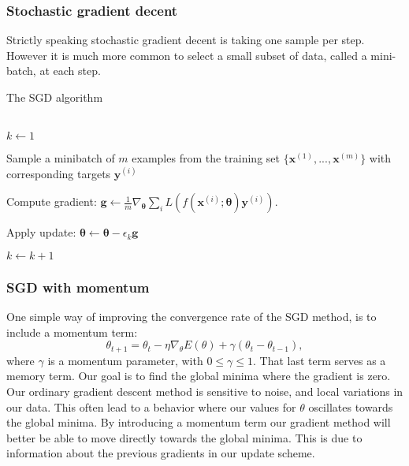 \subsubsection{Stochastic gradient decent}
Strictly speaking stochastic gradient decent is taking one sample per step. 
However it is much more common to select a small subset of data, called a
mini-batch, at each step.

\begin{algorithm}
\caption{The SGD algorithm}\label{alg:SGD}
\begin{algorithmic}
    \\
    $k\gets1$

     Sample a minibatch of $m$ examples from the training set
        $\{\boldsymbol{x}^{(1)}, ..., \boldsymbol{x}^{(m)}\}$ with corresponding
        targets $\boldsymbol{y}^{(i)}$
        
        Compute gradient: $\boldsymbol{g} \gets
        \frac{1}{m}\nabla_{\boldsymbol\theta}
        \sum_{i}L(f(\boldsymbol{x}^{(i)};\boldsymbol{\theta})\boldsymbol{y}^{(i)})$.
        
        Apply update: $\boldsymbol{\theta} \gets
        \boldsymbol{\theta}-\epsilon_k\boldsymbol{g}$

        $k\gets k+1$
    \EndWhile
\end{algorithmic}
\end{algorithm}


\subsubsection{SGD with momentum}


One simple way of improving the convergence rate of the SGD method, is to
include a momentum term: 
\begin{equation*}
    \theta _{t+1} = \theta _t - \eta \nabla_\theta E(\theta )+\gamma (\theta_t
    -\theta_{t-1}     ) ,
\end{equation*}
where $\gamma $ is a momentum parameter, with $0\leq \gamma \leq1$. That last
term serves as a memory term. Our goal is to find the
global minima where the gradient is zero. Our ordinary gradient descent method
is sensitive to noise, and local variations in our data.
This often lead to a behavior where our values for $\theta $ oscillates
towards the global minima. %
By introducing a momentum term our gradient method will better be able to move
directly towards the global minima. This is due to information about the previous
gradients in our update scheme.     

